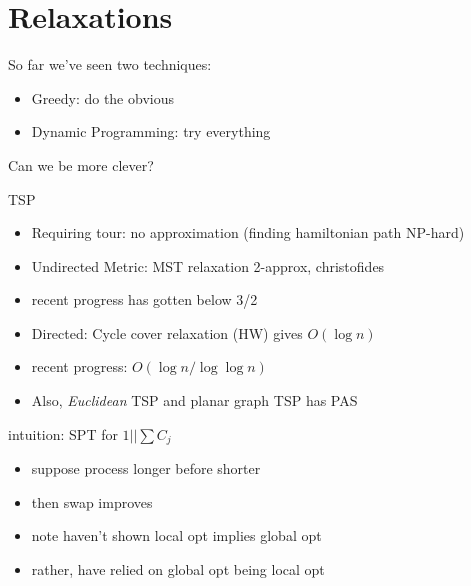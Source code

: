 \documentclass{article}
\begin{document}

\section*{Relaxations}

So far we've seen two techniques:
\begin{itemize}
\item Greedy: do the obvious
\item Dynamic Programming: try everything
\end{itemize}
Can we be more clever?

TSP
\begin{itemize}
\item Requiring tour: no approximation (finding hamiltonian path
  NP-hard)
\item Undirected Metric: MST relaxation 2-approx, christofides
\item recent progress has gotten below 3/2
\item Directed: Cycle cover relaxation (HW) gives $O(\log n)$
\item recent progress: $O(\log n / \log\log n)$
\item Also, \emph{Euclidean} TSP and planar graph TSP has PAS
\end{itemize}


intuition: SPT for $1||\sum C_j$
\begin{itemize}
\item suppose process longer before shorter
\item then swap improves
\item note haven't shown local opt implies global opt
\item rather, have relied on global opt being local opt
\end{itemize}
\end{document}
